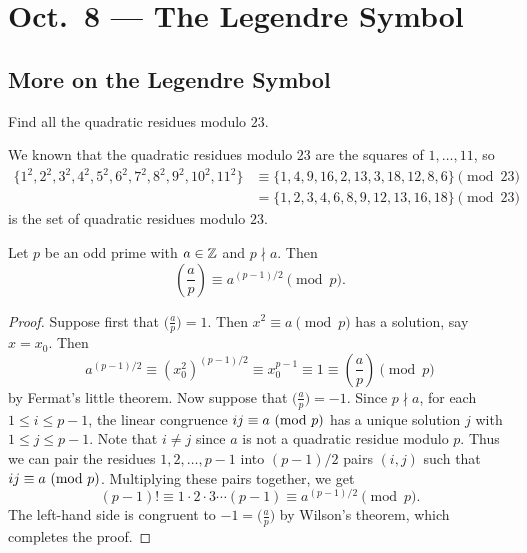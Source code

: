 \chapter{Oct.~8 --- The Legendre Symbol}

\section{More on the Legendre Symbol}

\begin{exercise}
  Find all the quadratic residues
  modulo $23$.

  We known that the quadratic residues modulo $23$ are the squares of
  $1, \dots, 11$, so
  \begin{align*}
    \{1^2, 2^2, 3^2, 4^2, 5^2, 6^2, 7^2, 8^2, 9^2, 10^2, 11^2\}
    &\equiv
    \{1, 4, 9, 16, 2, 13, 3, 18, 12, 8, 6\} \pmod{23} \\
    &= \{1, 2, 3, 4, 6, 8, 9, 12, 13, 16, 18\}
    \pmod{23}
  \end{align*}
  is the set of quadratic residues modulo $23$.
\end{exercise}

\begin{theorem}
  Let $p$ be an odd prime with
  $a \in \mathbb{Z}$ and $p \nmid a$. Then
  \[
    \left( \frac{a}{p} \right) \equiv a^{(p - 1) / 2} \pmod{p}.
  \]
\end{theorem}

\begin{proof}
  Suppose first that
  $\big(\frac{a}{p}\big) = 1$.
  Then $x^2 \equiv a \pmod{p}$ has a
  solution, say $x = x_0$. Then
  \[
    a^{(p - 1) / 2}
    \equiv (x_0^2)^{(p - 1) / 2}
    \equiv x_0^{p - 1}
    \equiv 1
    \equiv \left( \frac{a}{p} \right)
    \pmod{p}
  \]
  by Fermat's little theorem. Now
  suppose that
  $\big(\frac{a}{p}\big) = -1$. Since
  $p \nmid a$, for each
  $1 \le i \le p - 1$,
  the linear congruence
  $i j \equiv a \ (\mathrm{mod}\ p)$ has a unique
  solution
  $j$ with $1 \le j \le p - 1$.
  Note that $i \ne j$ since
  $a$ is not a quadratic residue modulo $p$.
  Thus we can pair the residues
  $1, 2, \dots, p - 1$ into
  $(p - 1) / 2$ pairs $(i, j)$ such
  that $i j \equiv a \ (\mathrm{mod}\ p)$.
  Multiplying these pairs together,
  we get
  \[
    (p - 1)!
    \equiv 1 \cdot 2 \cdot 3 \cdots (p - 1)
    \equiv a^{(p - 1) / 2} \pmod{p}.
  \]
  The left-hand side is congruent to
  $-1 = \big(\frac{a}{p}\big)$
  by Wilson's theorem, which completes
  the proof.
\end{proof}


